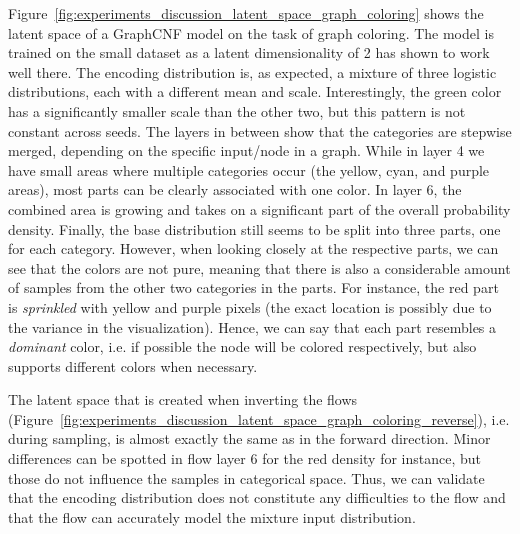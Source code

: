 Figure~\ref{fig:experiments_discussion_latent_space_graph_coloring} shows the latent space of a GraphCNF model on the task of graph coloring.
The model is trained on the small dataset as a latent dimensionality of 2 has shown to work well there.
The encoding distribution is, as expected, a mixture of three logistic distributions, each with a different mean and scale.
Interestingly, the green color has a significantly smaller scale than the other two, but this pattern is not constant across seeds. 
The layers in between show that the categories are stepwise merged, depending on the specific input/node in a graph.
While in layer 4 we have small areas where multiple categories occur (the yellow, cyan, and purple areas), most parts can be clearly associated with one color.
In layer 6, the combined area is growing and takes on a significant part of the overall probability density.
Finally, the base distribution still seems to be split into three parts, one for each category.
However, when looking closely at the respective parts, we can see that the colors are not pure, meaning that there is also a considerable amount of samples from the other two categories in the parts.
For instance, the red part is \textit{sprinkled} with yellow and purple pixels (the exact location is possibly due to the variance in the visualization).
Hence, we can say that each part resembles a \textit{dominant} color, i.e. if possible the node will be colored respectively, but also supports different colors when necessary.

The latent space that is created when inverting the flows (Figure~\ref{fig:experiments_discussion_latent_space_graph_coloring_reverse}), i.e. during sampling, is almost exactly the same as in the forward direction. 
Minor differences can be spotted in flow layer 6 for the red density for instance, but those do not influence the samples in categorical space. 
Thus, we can validate that the encoding distribution does not constitute any difficulties to the flow and that the flow can accurately model the mixture input distribution.

